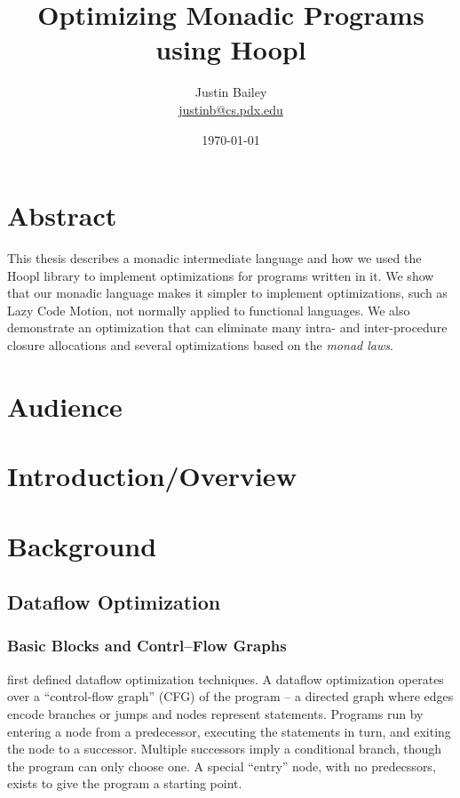 \documentclass[11pt]{article}
\title{Optimizing Monadic Programs using Hoopl}
\author{Justin Bailey \\ \url{justinb@cs.pdx.edu}}
\date{\today}
\begin{document}
\VerbatimFootnotes
\DefineShortVerb{\#}
\doublespacing

\maketitle

\section{Abstract}

This thesis describes a monadic intermediate language and how we used
the Hoopl library to implement optimizations for programs written in
it. We show that our monadic language makes it simpler to implement
optimizations, such as Lazy Code Motion, not normally applied to
functional languages. We also demonstrate an optimization that can
eliminate many intra- and inter-procedure closure allocations and
several optimizations based on the \emph{monad laws}.

\section{Audience}

\section{Introduction/Overview}

\section{Background}
\subsection{Dataflow Optimization}


\subsubsection{Basic Blocks and Contrl--Flow Graphs}

\citet{SoAndSo} first defined dataflow
optimization techniques. A dataflow optimization operates over a
``control-flow graph'' (CFG) of the program -- a directed graph where edges
encode branches or jumps and nodes represent statements. Programs run
by entering a node from a predecessor, executing the statements in
turn, and exiting the node to a successor. Multiple successors imply a
conditional branch, though the program can only choose one. A special
``entry'' node, with no predecssors, exists to give the program a
starting point.
\end{document}
